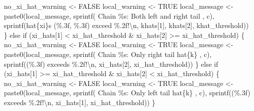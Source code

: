 \documentclass[
  letterpaper,
  DIV=11,
  numbers=noendperiod]{scrartcl}
\newenvironment{Shaded}{\begin{snugshade}}{\end{snugshade}}
\newcommand{\ConstantTok}[1]{\textcolor[rgb]{0.56,0.35,0.01}{#1}}
\newcommand{\ControlFlowTok}[1]{\textcolor[rgb]{0.00,0.23,0.31}{#1}}
\newcommand{\DecValTok}[1]{\textcolor[rgb]{0.68,0.00,0.00}{#1}}
\newcommand{\FunctionTok}[1]{\textcolor[rgb]{0.28,0.35,0.67}{#1}}
\newcommand{\NormalTok}[1]{\textcolor[rgb]{0.00,0.23,0.31}{#1}}
\newcommand{\OtherTok}[1]{\textcolor[rgb]{0.00,0.23,0.31}{#1}}
\newcommand{\SpecialCharTok}[1]{\textcolor[rgb]{0.37,0.37,0.37}{#1}}
\newcommand{\StringTok}[1]{\textcolor[rgb]{0.13,0.47,0.30}{#1}}
\begin{document}
\begin{Shaded}
\begin{Highlighting}[]
\NormalTok{        no\_xi\_hat\_warning }\OtherTok{\textless{}{-}} \ConstantTok{FALSE}
\NormalTok{        local\_warning }\OtherTok{\textless{}{-}} \ConstantTok{TRUE}
\NormalTok{        local\_message }\OtherTok{\textless{}{-}}
          \FunctionTok{paste0}\NormalTok{(local\_message,}
                \FunctionTok{sprintf}\NormalTok{(}\StringTok{\textquotesingle{}  Chain \%s: Both left and right tail \textquotesingle{}}\NormalTok{, c),}
                \FunctionTok{sprintf}\NormalTok{(}\StringTok{\textquotesingle{}hat\{xi\}s (\%.3f, \%.3f) exceed \%.2f!}\SpecialCharTok{\textbackslash{}n}\StringTok{\textquotesingle{}}\NormalTok{, }
\NormalTok{                        khats[}\DecValTok{1}\NormalTok{], khats[}\DecValTok{2}\NormalTok{], khat\_threshold))}
\NormalTok{      \} }\ControlFlowTok{else} \ControlFlowTok{if}\NormalTok{ (xi\_hats[}\DecValTok{1}\NormalTok{] }\SpecialCharTok{\textless{}}\NormalTok{ xi\_hat\_threshold }\SpecialCharTok{\&} 
\NormalTok{                 xi\_hats[}\DecValTok{2}\NormalTok{] }\SpecialCharTok{\textgreater{}=}\NormalTok{ xi\_hat\_threshold) \{}
\NormalTok{        no\_xi\_hat\_warning }\OtherTok{\textless{}{-}} \ConstantTok{FALSE}
\NormalTok{        local\_warning }\OtherTok{\textless{}{-}} \ConstantTok{TRUE}
\NormalTok{        local\_message }\OtherTok{\textless{}{-}}
          \FunctionTok{paste0}\NormalTok{(local\_message,}
                 \FunctionTok{sprintf}\NormalTok{(}\StringTok{\textquotesingle{}  Chain \%s: Only right tail hat\{k\} \textquotesingle{}}\NormalTok{, c),}
                 \FunctionTok{sprintf}\NormalTok{(}\StringTok{\textquotesingle{}(\%.3f) exceeds \%.2f!}\SpecialCharTok{\textbackslash{}n}\StringTok{\textquotesingle{}}\NormalTok{,}
\NormalTok{                         xi\_hats[}\DecValTok{2}\NormalTok{], xi\_hat\_threshold))}
\NormalTok{      \} }\ControlFlowTok{else} \ControlFlowTok{if}\NormalTok{ (xi\_hats[}\DecValTok{1}\NormalTok{] }\SpecialCharTok{\textgreater{}=}\NormalTok{ xi\_hat\_threshold }\SpecialCharTok{\&} 
\NormalTok{                 xi\_hats[}\DecValTok{2}\NormalTok{] }\SpecialCharTok{\textless{}}\NormalTok{ xi\_hat\_threshold) \{}
\NormalTok{        no\_xi\_hat\_warning }\OtherTok{\textless{}{-}} \ConstantTok{FALSE}
\NormalTok{        local\_warning }\OtherTok{\textless{}{-}} \ConstantTok{TRUE}
\NormalTok{        local\_message }\OtherTok{\textless{}{-}}
          \FunctionTok{paste0}\NormalTok{(local\_message,}
                 \FunctionTok{sprintf}\NormalTok{(}\StringTok{\textquotesingle{}  Chain \%s: Only left tail hat\{k\} \textquotesingle{}}\NormalTok{, c),}
                 \FunctionTok{sprintf}\NormalTok{(}\StringTok{\textquotesingle{}(\%.3f) exceeds \%.2f!}\SpecialCharTok{\textbackslash{}n}\StringTok{\textquotesingle{}}\NormalTok{,}
\NormalTok{                         xi\_hats[}\DecValTok{1}\NormalTok{], xi\_hat\_threshold))}
\NormalTok{      \}}
      

\end{Highlighting}
\end{Shaded}
\end{document}
